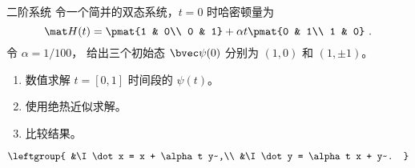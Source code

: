 \begin{example}{二阶系统}
令一个简并的双态系统，$t=0$ 时哈密顿量为
\begin{equation}
\mat H(t) = \pmat{1 & 0\\ 0 & 1}
+ \alpha t \pmat{0 & 1\\ 1 & 0}~.
\end{equation}
令 $\alpha = 1/100$， 给出三个初始态 $\bvec\psi(0)$ 分别为 $(1,0)$ 和 $(1,\pm 1)$。
\begin{enumerate}
\item 数值求解 $t=[0,1]$ 时间段的 $\psi(t)$。
\item 使用绝热近似求解。
\item 比较结果。
\end{enumerate}
\begin{equation}
\leftgroup{
&\I\dot x = x + \alpha t y~,\\
&\I\dot y = \alpha t x + y~.
}\end{equation}
\end{example}
